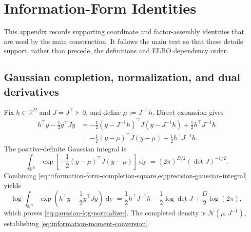 \chapter{Information-Form Identities}

This appendix records supporting coordinate and factor-assembly identities that are used by the main construction. It follows the main text so that these details support, rather than precede, the definitions and ELBO dependency order.

\section{Gaussian completion, normalization, and dual derivatives}

Fix $h\in\mathbb R^D$ and $J=J^\top\succ0$, and define $\mu:=J^{-1}h$.  Direct expansion gives
\begin{equation}
\begin{aligned}
h^\top y-\frac12y^\top Jy
&=-\frac12
\left(y-J^{-1}h\right)^\top
J
\left(y-J^{-1}h\right)
+\frac12h^\top J^{-1}h\\
&=-\frac12(y-\mu)^\top J(y-\mu)
+\frac12h^\top J^{-1}h.
\end{aligned}
\label{eq:information-form-completion-square}
\end{equation}
The positive-definite Gaussian integral is
\begin{equation}
\int_{\mathbb R^D}
\exp\left[-\frac12(y-\mu)^\top J(y-\mu)\right]
\mathop{\mathrm dy}
=(2\pi)^{D/2}(\det J)^{-1/2}.
\label{eq:precision-gaussian-integral}
\end{equation}
Combining \cref{eq:information-form-completion-square,eq:precision-gaussian-integral} yields
\begin{equation}
\log\int_{\mathbb R^D}
\exp\left(h^\top y-\frac12y^\top Jy\right)
\mathop{\mathrm dy}
=\frac12h^\top J^{-1}h
-\frac12\log\det J
+\frac D2\log(2\pi),
\label{eq:derived-gaussian-log-normalizer}
\end{equation}
which proves \cref{eq:gaussian-log-normalizer}.  The completed density is $\mathcal N(\mu,J^{-1})$, establishing \cref{eq:information-moment-conversion}.

